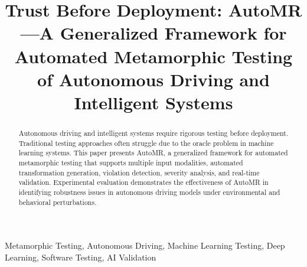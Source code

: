 \documentclass[conference]{IEEEtran}
\title{Trust Before Deployment: AutoMR---A Generalized Framework for Automated Metamorphic Testing of Autonomous Driving and Intelligent Systems}
\author{
\IEEEauthorblockN{Charith Manujaya}
\IEEEauthorblockA{
Department of Computing\\
University Name\\
Sri Lanka
}
}
\begin{document}
\maketitle

\begin{abstract}
Autonomous driving and intelligent systems require rigorous testing before deployment. Traditional testing approaches often struggle due to the oracle problem in machine learning systems. This paper presents AutoMR, a generalized framework for automated metamorphic testing that supports multiple input modalities, automated transformation generation, violation detection, severity analysis, and real-time validation. Experimental evaluation demonstrates the effectiveness of AutoMR in identifying robustness issues in autonomous driving models under environmental and behavioral perturbations.
\end{abstract}

\begin{IEEEkeywords}
Metamorphic Testing, Autonomous Driving, Machine Learning Testing, Deep Learning, Software Testing, AI Validation
\end{IEEEkeywords}











\end{document}
